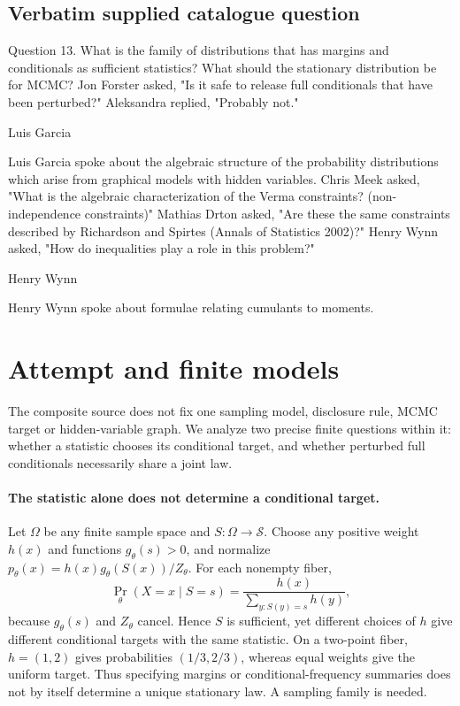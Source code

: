 \documentclass[11pt]{article}
\begin{document}
\subsection{Verbatim supplied catalogue question}
Question 13. What is the family of distributions that has margins and conditionals as sufficient statistics? What should the stationary distribution be for MCMC? Jon Forster asked, "Is it safe to release full conditionals that have been perturbed?" Aleksandra replied, "Probably not."

Luis Garcia

Luis Garcia spoke about the algebraic structure of the probability distributions which arise from graphical models with hidden variables. Chris Meek asked, "What is the algebraic characterization of the Verma constraints? (non-independence constraints)" Mathias Drton asked, "Are these the same constraints described by Richardson and Spirtes (Annals of Statistics 2002)?" Henry Wynn asked, "How do inequalities play a role in this problem?"

Henry Wynn

Henry Wynn spoke about formulae relating cumulants to moments.

\section{Attempt and finite models}
The composite source does not fix one sampling model, disclosure rule,
MCMC target or hidden-variable graph. We analyze two precise finite
questions within it: whether a statistic chooses its conditional target,
and whether perturbed full conditionals necessarily share a joint law.

\paragraph{The statistic alone does not determine a conditional target.}
Let $\Omega$ be any finite sample space and $S:\Omega\to\mathcal S$.
Choose any positive weight $h(x)$ and functions $g_\theta(s)>0$, and
normalize $p_\theta(x)=h(x)g_\theta(S(x))/Z_\theta$.
For each nonempty fiber,
\[
\Pr_\theta(X=x\mid S=s)
=\frac{h(x)}{\sum_{y:S(y)=s}h(y)},
\]
because $g_\theta(s)$ and $Z_\theta$ cancel. Hence $S$ is sufficient,
yet different choices of $h$ give different conditional targets with the
same statistic. On a two-point fiber, $h=(1,2)$ gives probabilities
$(1/3,2/3)$, whereas equal weights give the uniform target.
Thus specifying margins or conditional-frequency summaries does not by
itself determine a unique stationary law. A sampling family is needed.
\end{document}

